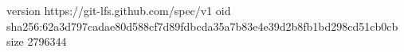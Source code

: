 version https://git-lfs.github.com/spec/v1
oid sha256:62a3d797cadae80d588cf7d89fdbcda35a7b83e4e39d2b8fb1bd298cd51cb0cb
size 2796344
